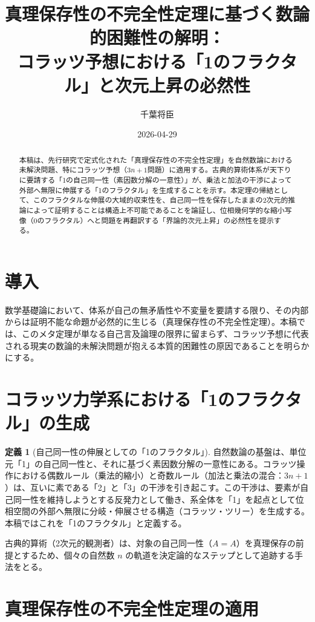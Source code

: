 \documentclass[11pt,a4paper]{article}
\title{真理保存性の不完全性定理に基づく数論的困難性の解明：\\コラッツ予想における「1のフラクタル」と次元上昇の必然性}
\author{千葉将臣}
\date{2026-04-29}
\theoremstyle{definition}
\newtheorem{definition}{定義}[section]
\begin{document}
\maketitle

\begin{abstract}
本稿は、先行研究で定式化された「真理保存性の不完全性定理」を自然数論における未解決問題、特にコラッツ予想（$3n+1$問題）に適用する。古典的算術体系が天下りに要請する「1の自己同一性（素因数分解の一意性）」が、乗法と加法の干渉によって外部へ無限に伸展する「1のフラクタル」を生成することを示す。本定理の帰結として、このフラクタルな伸展の大域的収束性を、自己同一性を保存したままの2次元的推論によって証明することは構造上不可能であることを論証し、位相幾何学的な縮小写像（0のフラクタル）へと問題を再翻訳する「界論的次元上昇」の必然性を提示する。
\end{abstract}

\section{導入}
数学基礎論において、体系が自己の無矛盾性や不変量を要請する限り、その内部からは証明不能な命題が必然的に生じる（真理保存性の不完全性定理）。本稿では、このメタ定理が単なる自己言及論理の限界に留まらず、コラッツ予想に代表される現実の数論的未解決問題が抱える本質的困難性の原因であることを明らかにする。

\section{コラッツ力学系における「1のフラクタル」の生成}

\begin{definition}[自己同一性の伸展としての「1のフラクタル」]
自然数論の基盤は、単位元「1」の自己同一性と、それに基づく素因数分解の一意性にある。コラッツ操作における偶数ルール（乗法的縮小）と奇数ルール（加法と乗法の混合：$3n+1$）は、互いに素である「2」と「3」の干渉を引き起こす。この干渉は、要素が自己同一性を維持しようとする反発力として働き、系全体を「1」を起点として位相空間の外部へ無限に分岐・伸展させる構造（コラッツ・ツリー）を生成する。本稿ではこれを「1のフラクタル」と定義する。
\end{definition}

古典的算術（2次元的観測者）は、対象の自己同一性（$A=A$）を真理保存の前提とするため、個々の自然数 $n$ の軌道を決定論的なステップとして追跡する手法をとる。

\section{真理保存性の不完全性定理の適用}
\end{document}
